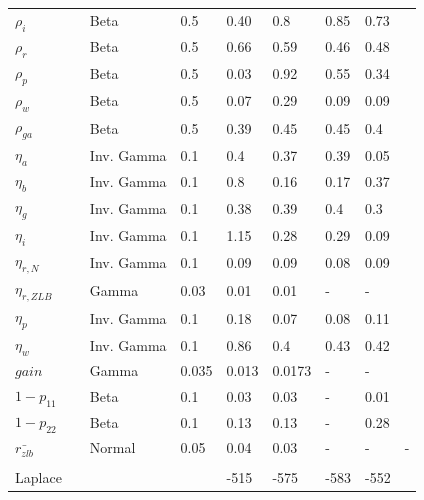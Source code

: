 \documentclass[12pt,reqno]{article}
\numberwithin{equation}{section}
\begin{document}
\begin{table}[H]
\begin{tabular}{llll|ll|lll}
$\rho_i$ &  & Beta & 0.5 		& 0.40 & 0.8 & 0.85 & 0.73 &  \\
$\rho_r$ &  & Beta & 0.5 		& 0.66 & 0.59 & 0.46 & 0.48 &  \\
$\rho_p$ &  & Beta & 0.5 		& 0.03 & 0.92 & 0.55 & 0.34 &  \\
$\rho_w$ &  & Beta & 0.5 		& 0.07 & 0.29 & 0.09 & 0.09 &  \\
$\rho_{ga}$ &  & Beta & 0.5 	& 0.39 & 0.45 & 0.45 & 0.4 &  \\
$\eta_a$ &  & Inv. Gamma & 0.1 	& 0.4 & 0.37 & 0.39 & 0.05 &  \\
$\eta_b$ &  & Inv. Gamma & 0.1 	& 0.8 & 0.16 & 0.17 & 0.37 &  \\
$\eta_g$ &  & Inv. Gamma & 0.1 			& 0.38 & 0.39 & 0.4 & 0.3 &  \\
$\eta_i$ &  & Inv. Gamma & 0.1 			& 1.15 & 0.28 & 0.29 & 0.09 &  \\
$\eta_{r,N}$ &  & Inv. Gamma & 0.1 		& 0.09 & 0.09 & 0.08 & 0.09 &  \\
$\eta_{r,ZLB}$ &  & Gamma & 0.03 		& 0.01 & 0.01 & - & - &  \\
$\eta_p$ &  & Inv. Gamma & 0.1			& 0.18 & 0.07 & 0.08 & 0.11 &  \\
$\eta_w$ &  & Inv. Gamma & 0.1 			& 0.86 & 0.4 & 0.43 & 0.42 &  \\
$gain$ &  & Gamma & 0.035 				& 0.013 & 0.0173 & - & - &  \\
$1-p_{11}$ &  & Beta & 0.1 				& 0.03 & 0.03 &-  & 0.01 &  \\
$1-p_{22}$ &  & Beta & 0.1 				& 0.13 & 0.13 & - & 0.28 &  \\
$\bar{r_{zlb}}$ &  & Normal & 0.05 		& 0.04 & 0.03 & - & - & - \\
 &  &  &  &  &  &  &  &  \\
Laplace &  &  &  & -515 & -575 & -583 & -552 & 
\end{tabular}
\end{table}
\end{document}
